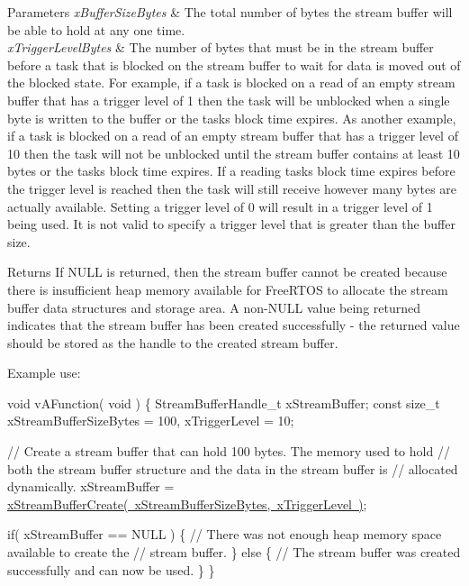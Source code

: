 \begin{DoxyParams}{Parameters}
{\em x\+Buffer\+Size\+Bytes} & The total number of bytes the stream buffer will be able to hold at any one time.\\
\hline
{\em x\+Trigger\+Level\+Bytes} & The number of bytes that must be in the stream buffer before a task that is blocked on the stream buffer to wait for data is moved out of the blocked state. For example, if a task is blocked on a read of an empty stream buffer that has a trigger level of 1 then the task will be unblocked when a single byte is written to the buffer or the task\textquotesingle{}s block time expires. As another example, if a task is blocked on a read of an empty stream buffer that has a trigger level of 10 then the task will not be unblocked until the stream buffer contains at least 10 bytes or the task\textquotesingle{}s block time expires. If a reading task\textquotesingle{}s block time expires before the trigger level is reached then the task will still receive however many bytes are actually available. Setting a trigger level of 0 will result in a trigger level of 1 being used. It is not valid to specify a trigger level that is greater than the buffer size.\\
\hline
\end{DoxyParams}
\begin{DoxyReturn}{Returns}
If N\+U\+LL is returned, then the stream buffer cannot be created because there is insufficient heap memory available for Free\+R\+T\+OS to allocate the stream buffer data structures and storage area. A non-\/\+N\+U\+LL value being returned indicates that the stream buffer has been created successfully -\/ the returned value should be stored as the handle to the created stream buffer.
\end{DoxyReturn}
Example use\+: 
\begin{DoxyPre}\end{DoxyPre}



\begin{DoxyPre}void vAFunction( void )
\{
StreamBufferHandle\_t xStreamBuffer;
const size\_t xStreamBufferSizeBytes = 100, xTriggerLevel = 10;\end{DoxyPre}



\begin{DoxyPre}    // Create a stream buffer that can hold 100 bytes.  The memory used to hold
    // both the stream buffer structure and the data in the stream buffer is
    // allocated dynamically.
    xStreamBuffer = \mbox{\hyperlink{stream__buffer_8h_a39aa4dd8b83e2df7ded291f863fb5fed}{xStreamBufferCreate( xStreamBufferSizeBytes, xTriggerLevel )}};\end{DoxyPre}



\begin{DoxyPre}    if( xStreamBuffer == NULL )
    \{
        // There was not enough heap memory space available to create the
        // stream buffer.
    \}
    else
    \{
        // The stream buffer was created successfully and can now be used.
    \}
\}
\end{DoxyPre}
 